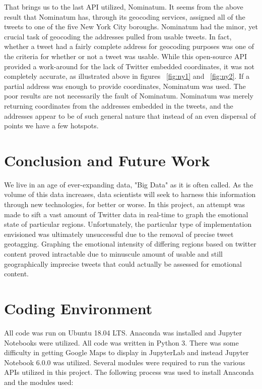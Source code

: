 \documentclass[12pt, oneside]{article}
\begin{document}
That brings us to the last API utilized, Nominatum. It seems from the above
result that Nominatum has, through its geocoding
services, assigned all of the tweets to one of the five New York City boroughs.
Nominatum had the minor, yet crucial task of geocoding the addresses pulled
from usable tweets. In fact, whether a
tweet had a fairly complete address for geocoding purposes was one of the
criteria for whether or not a tweet was usable. While this open-source API
provided a work-around for the lack of Twitter embedded coordinates, it was not
completely accurate, as illustrated above in figures ~\ref{fig:ny1} and
~\ref{fig:ny2}. If a
partial address was enough to provide coordinates, Nominatum was used. The poor
results are not necessarily the fault of Nominatum. Nominatum was merely
returning coordinates from the addresses embedded in the tweets, and the
addresses appear to be of such general nature that instead of an even dispersal
of points we have a few hotspots.


\section{Conclusion and Future Work}
We live in an age of ever-expanding data, "Big Data" as it is often called. As
the volume of this data increases, data scientists will seek to harness this
information through new technologies, for better or worse. In
this project, an attempt was made to sift a vast amount of Twitter data in
real-time to graph the emotional state of particular regions. Unfortunately,
the particular type of implementation envisioned was ultimately unsuccessful
due to the removal of precise tweet geotagging.
Graphing the emotional intensity of differing regions based on twitter content
proved intractable due to minuscule amount of usable and still geographically
imprecise tweets that could actually be assessed for emotional content.

\newpage{}


%


\newpage{}
\appendix{}
\section{Coding Environment}
All code was run on Ubuntu 18.04 LTS. Anaconda was installed and Jupyter
Notebooks were utilized. All code was written in Python 3. There was some
difficulty in getting Google Maps to display in JupyterLab and instead Jupyter
Notebook 6.0.0 was utilized. Several modules
were required to run the various APIs utilized in this project. The following
process was used to install Anaconda and the modules used:
\end{document}
